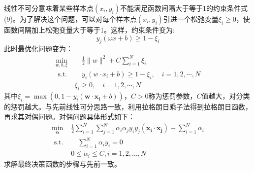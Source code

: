\documentclass{progartcn}
\begin{document}
线性不可分意味着某些样本点$(x_i,y_i)$不能满足函数间隔大于等于1的约束条件式(9)。为了解决这个问题，可以对每个样本点$(x_i,y_i)$引进一个松弛变量$\xi_i\geq 0$，使函数间隔加上松弛变量大于等于1。这样，约束条件变为:
\begin{equation}
	y_j(\omega x+b) \geq 1-\xi_i
\end{equation}
此时最优化问题变为：
\begin{equation}
	\begin{aligned}
		\min _{w, b, \xi} &\quad \frac{1}{2}\|w\|^{2}+C \sum_{i=1}^{N} \xi_{i} \\
		\text { s.t. } & \quad y_{i}\left(w \cdot x_{i}+b\right) \geq 1-\xi_{i}, \quad i=1,2, \cdots, N \\
		& \xi_{i} \geq 0, \quad i=1,2, \cdots, N
	\end{aligned}
\end{equation}
其中$\xi_{i}=\max \left(0,1-y_{i}\left(\boldsymbol{w} \cdot \boldsymbol{x}_{\boldsymbol{i}}+b\right)\right)$，$C>0$称为惩罚参数，$C$值越大，对分类的惩罚越大。与先前线性可分思路一致，利用拉格朗日乘子法得到拉格朗日函数，再求其对偶问题。对偶问题具体形式如下：
\begin{equation}
	\begin{aligned}
		\min _{\boldsymbol{\alpha}} &\frac{1}{2} \sum_{i=1}^{N} \sum_{j=1}^{N} \alpha_{i} \alpha_{j} y_{i} y_{j}\left(\boldsymbol{x}_{\boldsymbol{i}} \cdot \boldsymbol{x}_{\boldsymbol{j}}\right)-\sum_{i=1}^{N} \alpha_{i} \\
		\text { s.t. } &\quad \sum_{i=1}^{N} \alpha_{i} y_{i}=0 \\
		\quad & 0\leq \alpha_{i} \leq C, i=1,2, \ldots, N
	\end{aligned}
\end{equation}
求解最终决策函数的步骤与先前一致。
\end{document}
